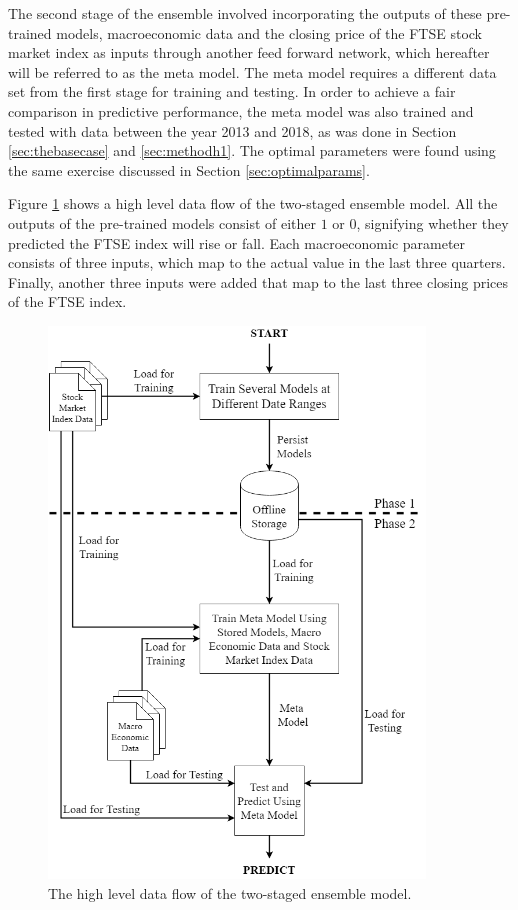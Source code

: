 \documentclass{UoYCSproject}
\begin{document}
The second stage of the ensemble involved incorporating the outputs of these pre-trained models, macroeconomic data and the closing price of the FTSE stock market index as inputs through another feed forward network, which hereafter will be referred to as the meta model. The meta model requires a different data set from the first stage for training and testing. In order to achieve a fair comparison in predictive performance, the meta model was also trained and tested with data between the year 2013 and 2018, as was done in Section \ref{sec:thebasecase} and \ref{sec:methodh1}. The optimal parameters were found using the same exercise discussed in Section \ref{sec:optimalparams}.  

Figure \ref{fig:metamodelflow} shows a high level data flow of the two-staged ensemble model. All the outputs of the pre-trained models consist of either $1$ or $0$, signifying whether they predicted the FTSE index will rise or fall. Each macroeconomic parameter consists of three inputs, which map to the actual value in the last three quarters. Finally, another three inputs were added that map to the last three closing prices of the FTSE index. 

\begin{figure}[h]
\includegraphics[width=10cm]{Meta-model.png}
\centering
\caption{The high level data flow of the two-staged ensemble model.} 
\label{fig:metamodelflow}
\end{figure}
\end{document}
